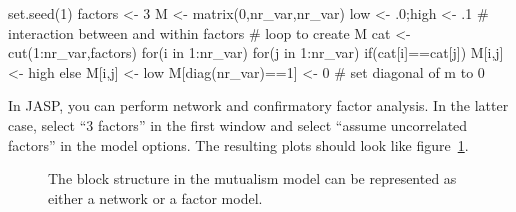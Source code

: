 \documentclass[
  a4paper,
  DIV=11,
  numbers=noendperiod,
  oneside]{scrreprt}
\newenvironment{Shaded}{}{}
\newcommand{\CommentTok}[1]{\textcolor[rgb]{0.42,0.45,0.49}{#1}}
\newcommand{\ControlFlowTok}[1]{\textcolor[rgb]{0.84,0.23,0.29}{#1}}
\newcommand{\DecValTok}[1]{\textcolor[rgb]{0.00,0.36,0.77}{#1}}
\newcommand{\FunctionTok}[1]{\textcolor[rgb]{0.44,0.26,0.76}{#1}}
\newcommand{\NormalTok}[1]{\textcolor[rgb]{0.14,0.16,0.18}{#1}}
\newcommand{\OtherTok}[1]{\textcolor[rgb]{0.44,0.26,0.76}{#1}}
\newcommand{\SpecialCharTok}[1]{\textcolor[rgb]{0.00,0.36,0.77}{#1}}
\begin{document}
\begin{Shaded}
\begin{Highlighting}[]
\FunctionTok{set.seed}\NormalTok{(}\DecValTok{1}\NormalTok{)}
\NormalTok{factors }\OtherTok{\textless{}{-}} \DecValTok{3}
\NormalTok{M }\OtherTok{\textless{}{-}} \FunctionTok{matrix}\NormalTok{(}\DecValTok{0}\NormalTok{,nr\_var,nr\_var)}
\NormalTok{low }\OtherTok{\textless{}{-}}\NormalTok{ .}\DecValTok{0}\NormalTok{;high }\OtherTok{\textless{}{-}}\NormalTok{ .}\DecValTok{1} \CommentTok{\# interaction between and within factors}
\CommentTok{\# loop to create M}
\NormalTok{cat }\OtherTok{\textless{}{-}} \FunctionTok{cut}\NormalTok{(}\DecValTok{1}\SpecialCharTok{:}\NormalTok{nr\_var,factors)}
\ControlFlowTok{for}\NormalTok{(i }\ControlFlowTok{in} \DecValTok{1}\SpecialCharTok{:}\NormalTok{nr\_var)}
  \ControlFlowTok{for}\NormalTok{(j }\ControlFlowTok{in} \DecValTok{1}\SpecialCharTok{:}\NormalTok{nr\_var)}
    \ControlFlowTok{if}\NormalTok{(cat[i]}\SpecialCharTok{==}\NormalTok{cat[j]) M[i,j] }\OtherTok{\textless{}{-}}\NormalTok{ high }\ControlFlowTok{else}\NormalTok{ M[i,j] }\OtherTok{\textless{}{-}}\NormalTok{ low}
\NormalTok{M[}\FunctionTok{diag}\NormalTok{(nr\_var)}\SpecialCharTok{==}\DecValTok{1}\NormalTok{] }\OtherTok{\textless{}{-}} \DecValTok{0} \CommentTok{\# set diagonal of m to 0}
\end{Highlighting}
\end{Shaded}

In JASP, you can perform network and confirmatory factor analysis. In
the latter case, select ``3 factors'' in the first window and select
``assume uncorrelated factors'' in the model options. The resulting
plots should look like figure~\ref{fig-ch6-img17-old-86}.

\begin{figure}


\caption{\label{fig-ch6-img17-old-86}The block structure in the
mutualism model can be represented as either a network or a factor
model.}

\end{figure}%
\end{document}
